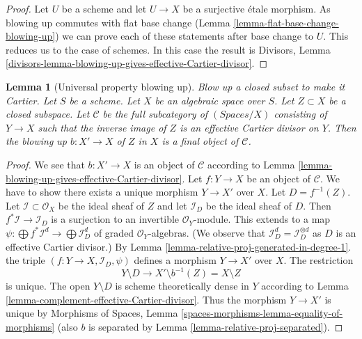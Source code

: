 \documentclass{stacks-project}
\newenvironment{slogan}{\comment}{\endcomment}
\theoremstyle{plain}
\newtheorem{lemma}[subsection]{Lemma}
\theoremstyle{definition}
\theoremstyle{remark}
\numberwithin{equation}{subsection}
\begin{document}
\begin{proof}
Let $U$ be a scheme and let $U \to X$ be a surjective \'etale morphism.
As blowing up commutes with flat base change
(Lemma \ref{lemma-flat-base-change-blowing-up})
we can prove each of these statements after base change to $U$.
This reduces us to the case of schemes.
In this case the result is
Divisors, Lemma
\ref{divisors-lemma-blowing-up-gives-effective-Cartier-divisor}.
\end{proof}

\begin{lemma}[Universal property blowing up]
\label{lemma-universal-property-blowing-up}
\begin{slogan}
Blow up a closed subset to make it Cartier.
\end{slogan}
Let $S$ be a scheme.
Let $X$ be an algebraic space over $S$.
Let $Z \subset X$ be a closed subspace.
Let $\mathcal{C}$ be the full subcategory of $(\textit{Spaces}/X)$ consisting
of $Y \to X$ such that the inverse image of $Z$ is an effective
Cartier divisor on $Y$. Then the blowing up $b : X' \to X$ of $Z$ in $X$
is a final object of $\mathcal{C}$.
\end{lemma}

\begin{proof}
We see that $b : X' \to X$ is an object of $\mathcal{C}$ according to
Lemma \ref{lemma-blowing-up-gives-effective-Cartier-divisor}.
Let $f : Y \to X$ be an object of $\mathcal{C}$. We have to show there exists
a unique morphism $Y \to X'$ over $X$. Let $D = f^{-1}(Z)$.
Let $\mathcal{I} \subset \mathcal{O}_X$ be the ideal sheaf of $Z$
and let $\mathcal{I}_D$ be the ideal sheaf of $D$. Then
$f^*\mathcal{I} \to \mathcal{I}_D$ is a surjection
to an invertible $\mathcal{O}_Y$-module. This extends to a map
$\psi : \bigoplus f^*\mathcal{I}^d \to \bigoplus \mathcal{I}_D^d$
of graded $\mathcal{O}_Y$-algebras. (We observe that
$\mathcal{I}_D^d = \mathcal{I}_D^{\otimes d}$ as $D$ is an
effective Cartier divisor.) By
Lemma \ref{lemma-relative-proj-generated-in-degree-1}.
the triple $(f : Y \to X, \mathcal{I}_D, \psi)$ defines a
morphism $Y \to X'$ over $X$. The restriction
$$
Y \setminus D \longrightarrow X' \setminus b^{-1}(Z) = X \setminus Z
$$
is unique. The open $Y \setminus D$ is scheme theoretically dense in $Y$
according to Lemma \ref{lemma-complement-effective-Cartier-divisor}. 
Thus the morphism $Y \to X'$ is unique by
Morphisms of Spaces, Lemma \ref{spaces-morphisms-lemma-equality-of-morphisms}
(also $b$ is separated by Lemma
\ref{lemma-relative-proj-separated}).
\end{proof}
\end{document}
